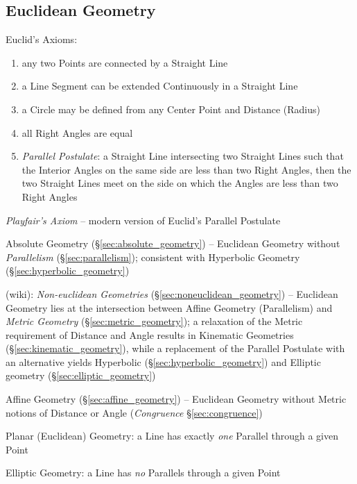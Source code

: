 \subsection{Euclidean Geometry}\label{sec:euclidean_geometry}

Euclid's Axioms:
\begin{enumerate}
  \item any two Points are connected by a Straight Line
  \item a Line Segment can be extended Continuously in a Straight Line
  \item a Circle may be defined from any Center Point and Distance (Radius)
  \item all Right Angles are equal
  \item \emph{Parallel Postulate}: a Straight Line intersecting two Straight
    Lines such that the Interior Angles on the same side are less than two Right
    Angles, then the two Straight Lines meet on the side on which the Angles are
    less than two Right Angles
\end{enumerate}

\emph{Playfair's Axiom} -- modern version of Euclid's Parallel Postulate

Absolute Geometry (\S\ref{sec:absolute_geometry}) -- Euclidean Geometry
without \emph{Parallelism} (\S\ref{sec:parallelism}); consistent with Hyperbolic
Geometry (\S\ref{sec:hyperbolic_geometry})

(wiki): \emph{Non-euclidean Geometries} (\S\ref{sec:noneuclidean_geometry}) --
Euclidean Geometry lies at the intersection between Affine Geometry
(Parallelism) and \emph{Metric Geometry} (\S\ref{sec:metric_geometry}); a
relaxation of the Metric requirement of Distance and Angle results in Kinematic
Geometries (\S\ref{sec:kinematic_geometry}), while a replacement of the Parallel
Postulate with an alternative yields Hyperbolic
(\S\ref{sec:hyperbolic_geometry}) and Elliptic geometry
(\S\ref{sec:elliptic_geometry})

Affine Geometry (\S\ref{sec:affine_geometry}) -- Euclidean Geometry without
Metric notions of Distance or Angle (\emph{Congruence} \S\ref{sec:congruence})

Planar (Euclidean) Geometry: a Line has exactly \emph{one} Parallel through a
given Point

\fist Elliptic Geometry: a Line has \emph{no} Parallels through a given Point

